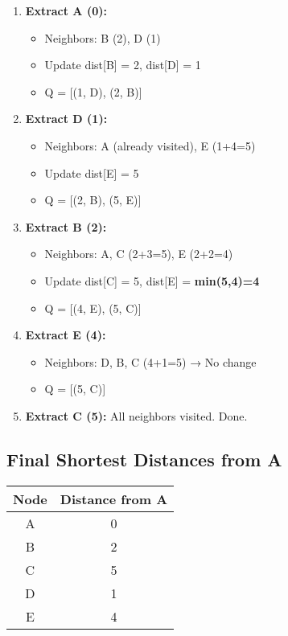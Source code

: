 \documentclass[14pt,a4paper]{extarticle}
\begin{document}
\begin{enumerate}
    \item \textbf{Extract A (0):}
    \begin{itemize}
        \item Neighbors: B (2), D (1)
        \item Update dist[B] = 2, dist[D] = 1
        \item Q = [(1, D), (2, B)]
    \end{itemize}

    \item \textbf{Extract D (1):}
    \begin{itemize}
        \item Neighbors: A (already visited), E (1+4=5)
        \item Update dist[E] = 5
        \item Q = [(2, B), (5, E)]
    \end{itemize}

    \item \textbf{Extract B (2):}
    \begin{itemize}
        \item Neighbors: A, C (2+3=5), E (2+2=4)
        \item Update dist[C] = 5, dist[E] = \textbf{min(5,4)=4}
        \item Q = [(4, E), (5, C)]
    \end{itemize}

    \item \textbf{Extract E (4):}
    \begin{itemize}
        \item Neighbors: D, B, C (4+1=5) → No change
        \item Q = [(5, C)]
    \end{itemize}

    \item \textbf{Extract C (5):} All neighbors visited. Done.
\end{enumerate}

\subsection*{Final Shortest Distances from A}
\begin{center}
\begin{tabular}{|c|c|}
\hline
\textbf{Node} & \textbf{Distance from A} \\
\hline
A & 0 \\
B & 2 \\
C & 5 \\
D & 1 \\
E & 4 \\
\hline
\end{tabular}
\end{center}
\end{document}
